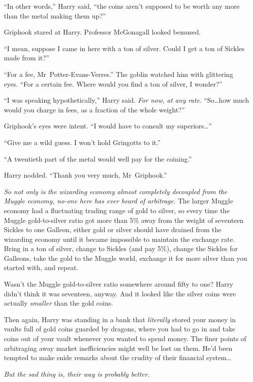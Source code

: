 “In other words,” Harry said, “the coins aren’t supposed to be worth any more than the metal making them up?”

Griphook stared at Harry. Professor McGonagall looked bemused.

“I mean, suppose I came in here with a ton of silver. Could I get a ton of Sickles made from it?”

“For a fee, Mr~Potter-Evans-Verres.” The goblin watched him with glittering eyes. “For a certain fee. Where would you find a ton of silver, I wonder?”

“I was speaking hypothetically,” Harry said. \emph{For now, at any rate.} “So…how much would you charge in fees, as a fraction of the whole weight?”

Griphook’s eyes were intent. “I would have to consult my superiors…”

“Give me a wild guess. I won’t hold Gringotts to it.”

“A twentieth part of the metal would well pay for the coining.”

Harry nodded. “Thank you very much, Mr~Griphook.”

\emph{So not only is the wizarding economy almost completely decoupled from the Muggle economy, no-one here has ever heard of arbitrage.} The larger Muggle economy had a fluctuating trading range of gold to silver, so every time the Muggle gold-to-silver ratio got more than 5\% away from the weight of seventeen Sickles to one Galleon, either gold or silver should have drained from the wizarding economy until it became impossible to maintain the exchange rate. Bring in a ton of silver, change to Sickles (and pay 5\%), change the Sickles for Galleons, take the gold to the Muggle world, exchange it for more silver than you started with, and repeat.

Wasn’t the Muggle gold-to-silver ratio somewhere around fifty to one? Harry didn’t think it was seventeen, anyway. And it looked like the silver coins were actually \emph{smaller} than the gold coins.

Then again, Harry was standing in a bank that \emph{literally} stored your money in vaults full of gold coins guarded by dragons, where you had to go in and take coins out of your vault whenever you wanted to spend money. The finer points of arbitraging away market inefficiencies might well be lost on them. He’d been tempted to make snide remarks about the crudity of their financial system…

\emph{But the sad thing is, their way is probably better.}

